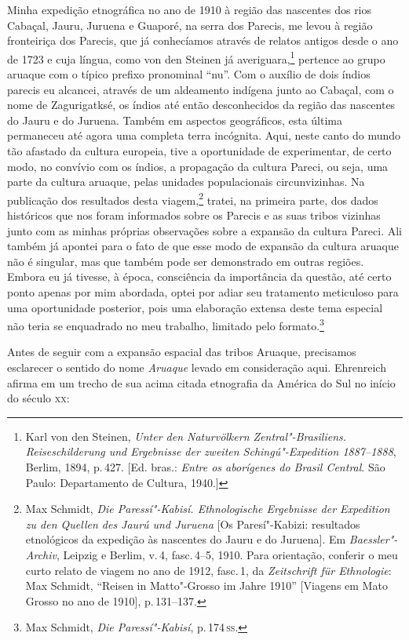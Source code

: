 Minha expedição etnográfica no ano de 1910 à região das nascentes dos
rios Cabaçal, Jauru, Juruena e Guaporé, na serra dos Parecis, me levou à
região fronteiriça dos Parecis, que já conhecíamos através de relatos
antigos desde o ano de 1723 e cuja língua, como von den Steinen já
averiguara,\footnote{Karl von den Steinen, \textit{Unter den Naturvölkern
  Zentral"-Brasiliens. Reiseschilderung und Ergebnisse der zweiten
  Schingú"-Expedition 1887--1888}, Berlim, 1894, p.\,427. {[}Ed. bras.: \textit{Entre os aborígenes do Brasil Central}. São Paulo: Departamento de Cultura, 1940.{]}} pertence ao grupo aruaque com o
típico prefixo pronominal ``nu''. Com o auxílio de dois índios parecis
eu alcancei, através de um aldeamento indígena junto ao Cabaçal, com o
nome de Zagurigatksé, os índios até então desconhecidos da região das
nascentes do Jauru e do Juruena. Também em aspectos geográficos, esta
última permaneceu até agora uma completa terra incógnita. Aqui, neste
canto do mundo tão afastado da cultura europeia, tive a oportunidade de
experimentar, de certo modo, no convívio com os índios, a propagação da
cultura Pareci, ou seja, uma parte da cultura aruaque, pelas unidades
populacionais circunvizinhas. Na publicação dos resultados desta
viagem,\footnote{Max Schmidt, \textit{Die Paressí"-Kabisí. Ethnologische
  Ergebnisse der Expedition zu den Quellen des Jaurú und Juruena} {[}Os Paresí"-Kabizi: resultados etnológicos da expedição às nascentes do Jauru e do Juruena{]}. Em \textit{Baessler"-Archiv}, Leipzig e Berlim, v.\,4, fasc.\,4--5, 1910. Para orientação, conferir o meu curto
  relato de viagem no ano de 1912, fasc.\,1, da \textit{Zeitschrift für
  Ethnologie}: Max Schmidt, ``Reisen in Matto"-Grosso im Jahre 1910'' {[}Viagens em Mato Grosso no ano de 1910{]}, p.\,131--137.} tratei, na
primeira parte, dos dados históricos que nos foram informados sobre os
Parecis e as suas tribos vizinhas junto com as minhas próprias
observações sobre a expansão da cultura Pareci. Ali também já apontei
para o fato de que esse modo de expansão da cultura aruaque não é singular, mas que
também pode ser demonstrado em outras regiões. Embora eu já tivesse,
à época, consciência da importância da questão, até certo ponto apenas
por mim abordada, optei por adiar seu
tratamento meticuloso para uma oportunidade posterior, pois uma
elaboração extensa deste tema especial não teria se enquadrado no meu
trabalho, limitado pelo formato.\footnote{Max Schmidt, \textit{Die
  Paressí"-Kabisí}, p.\,174\,\textsc{ss}.}

Antes de seguir com a expansão espacial das tribos Aruaque, precisamos
esclarecer o sentido do nome \textit{Aruaque} levado em consideração aqui.
Ehrenreich afirma em um trecho de sua acima citada etnografia da América
do Sul no início do século \textsc{xx}: 

